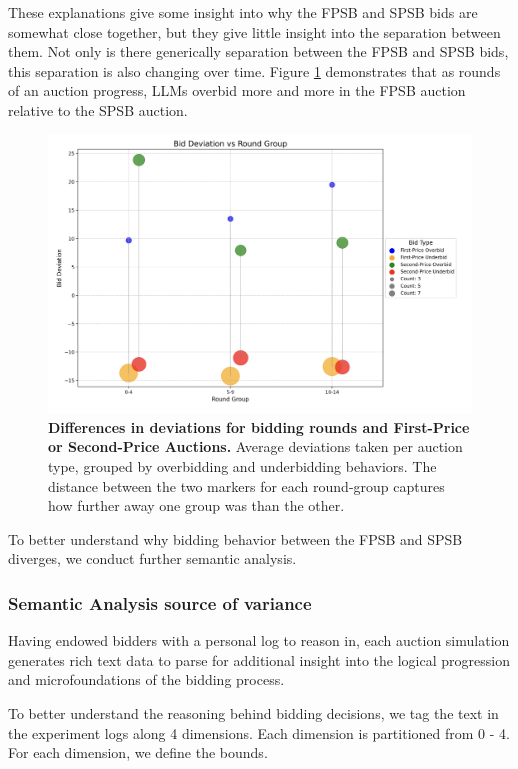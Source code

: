 \documentclass{article} %
\begin{document}
These explanations give some insight into why the FPSB and SPSB bids are somewhat close together, but they give little insight into the separation between them. Not only is there generically separation between the FPSB and SPSB bids, this separation is also changing over time. Figure \ref{fig:FPSBvsSPSBbyTime} demonstrates that as rounds of an auction progress, LLMs overbid more and more in the FPSB auction relative to the SPSB auction.

\begin{figure}[h!]
    \centering 
    \hspace{2cm}\includegraphics[width=0.85\linewidth]{Figs/FP_SP_round.png}
    \caption{\textbf{ Differences in deviations for bidding rounds and First-Price or Second-Price Auctions.} Average deviations taken per auction type, grouped by overbidding and underbidding behaviors. The distance between the two markers for each round-group captures how further away one group was than the other. }
    \label{fig:FPSBvsSPSBbyTime}
\end{figure}


To better understand why bidding behavior between the FPSB and SPSB diverges, we conduct further semantic analysis.

\subsubsection{Semantic Analysis source of variance}
Having endowed bidders with a personal log to reason in, each auction simulation generates rich text data to parse for additional insight into the logical progression and microfoundations of the bidding process.

To better understand the reasoning behind bidding decisions, we tag the text in the experiment logs along 4 dimensions. Each dimension is partitioned from 0 - 4. For each dimension, we define the bounds.
\end{document}
